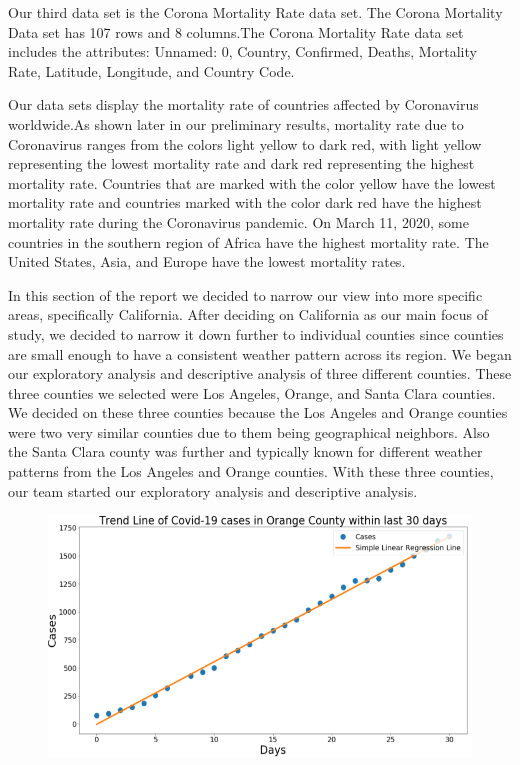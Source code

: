\documentclass[10pt,journal,compsoc]{IEEEtran}
\begin{document}
{{	Our third data set is the Corona Mortality Rate data set. \cite{Mooney-2020} The Corona Mortality Data set has 107 rows and 8 columns.The Corona Mortality Rate data set includes the attributes: Unnamed: 0, Country, Confirmed, Deaths, Mortality Rate, Latitude, Longitude, and Country Code.

	Our data sets display the mortality rate of countries affected by Coronavirus worldwide.As shown later in our preliminary results, mortality rate due to Coronavirus ranges from the colors light yellow to dark red, with light yellow representing the lowest mortality rate and dark red representing the highest mortality rate. Countries that are marked with the color yellow have the lowest mortality rate and countries marked with the color dark red have the highest mortality rate during the Coronavirus pandemic. On March 11, 2020, some countries in the southern region of Africa have the highest mortality rate. The United States, Asia, and Europe have the lowest mortality rates.

	In this section of the report we decided to narrow our view into more specific areas, specifically California. After deciding on California as our main focus of study, we decided to narrow it down further to individual counties since counties are small enough to have a consistent weather pattern across its region. We began our exploratory analysis and descriptive analysis of three different counties.\cite{NOAA-2020} \cite{MyrnaMFL-2020} These three counties we selected were Los Angeles, Orange, and Santa Clara counties. We decided on these three counties because the Los Angeles and Orange counties were two very similar counties due to them being geographical neighbors. Also the Santa Clara county was further and typically known for different weather patterns from the Los Angeles and Orange counties. With these three counties, our team started our exploratory analysis and descriptive analysis.

\begin{figure}[!htbp] %
	\includegraphics[scale=0.45]{covid-orange.png}\\ 
	\centering
	\label{LP-COVID-Orange County}
\end{figure}

}}
\end{document}
